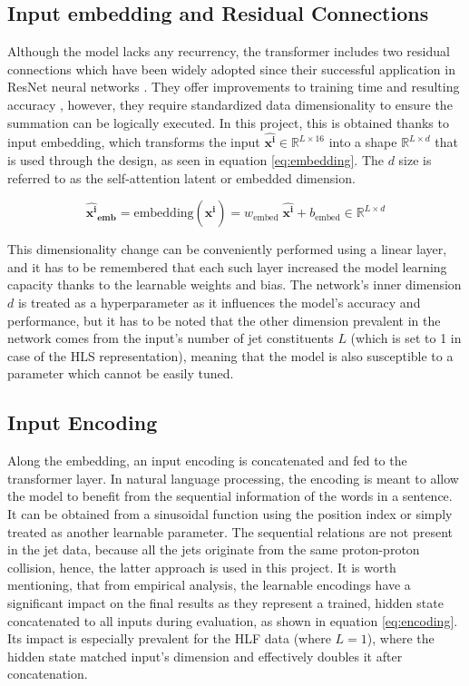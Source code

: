 \subsection{Input embedding and Residual Connections}
Although the model lacks any recurrency, the transformer includes two residual connections which have been widely adopted since their successful application in ResNet neural networks \cite{75-kaiming2016deep}. They offer improvements to training time and resulting accuracy \cite{74-szegedy2016inception-v4}, however, they require standardized data dimensionality to ensure the summation can be logically executed. In this project, this is obtained thanks to input embedding, which transforms the input \(\bm{\hat{x^i}} \in \mathbb{R}^{L \times 16} \) into a shape \(\mathbb{R}^{L \times d}\) that is used through the design, as seen in equation \ref{eq:embedding}. The \(d\) size is referred to as the self-attention latent or embedded dimension.

\begin{equation}\label{eq:embedding}
  \bm{\hat{x^i}_{\text{emb}}} = \text{embedding} ( \bm{\hat{x^i}} ) = w_{\text{embed}}\; \bm{\hat{x^i}} + b_{\text{embed}} \in \mathbb{R}^{L \times d}
\end{equation}

This dimensionality change can be conveniently performed using a linear layer, and it has to be remembered that each such layer increased the model learning capacity thanks to the learnable weights and bias. The network's inner dimension \(d\) is treated as a hyperparameter as it influences the model's accuracy and performance, but it has to be noted that the other dimension prevalent in the network comes from the input's number of jet constituents \(L\) (which is set to 1 in case of the HLS representation), meaning that the model is also susceptible to a parameter which cannot be easily tuned.


\subsection{Input Encoding}
Along the embedding, an input encoding is concatenated and fed to the transformer layer. In natural language processing, the encoding is meant to allow the model to benefit from the sequential information of the words in a sentence. It can be obtained from a sinusoidal function using the position index or simply treated as another learnable parameter. The sequential relations are not present in the jet data, because all the jets originate from the same proton-proton collision, hence, the latter approach is used in this project. It is worth mentioning, that from empirical analysis, the learnable encodings have a significant impact on the final results as they represent a trained, hidden state concatenated to all inputs during evaluation, as shown in equation \ref{eq:encoding}. Its impact is especially prevalent for the HLF data (where \(L = 1\)), where the hidden state matched input's dimension and effectively doubles it after concatenation.

